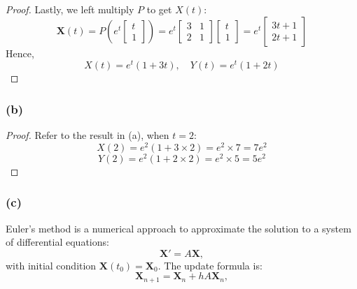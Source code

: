 \documentclass{article}
\begin{document}
\begin{proof}
    Lastly, we left multiply $P$ to get $X(t)$:
    \[ \mathbf{X}(t) = P \left( e^t \begin{bmatrix} t \\ 1 \end{bmatrix} \right) = e^t \begin{bmatrix} 3 & 1 \\ 2 & 1 \end{bmatrix} \begin{bmatrix} t \\ 1 \end{bmatrix} = e^t \begin{bmatrix} 3t + 1 \\ 2t + 1 \end{bmatrix} \]
    Hence,
    \[ X(t) = e^t(1 + 3t), \quad Y(t) = e^t (1 + 2t) \]
\end{proof} 

\subsubsection*{(b)}
\begin{proof}
    Refer to the result in (a), when $t = 2$:
    \[ X(2) = e^2(1 + 3 \times 2) = e^2 \times 7 = 7e^2 \]
    \[ Y(2) = e^2(1 + 2 \times 2) = e^2 \times 5 = 5e^2 \]
\end{proof}

\subsubsection*{(c)}
Euler's method is a numerical approach to approximate the solution to a system of differential equations:
\[
    \mathbf{X}' = A \mathbf{X},
\]
with initial condition \( \mathbf{X}(t_0) = \mathbf{X}_0 \). The update formula is:
\[
    \mathbf{X}_{n+1} = \mathbf{X}_n + h A \mathbf{X}_n,
\]
\end{document}
